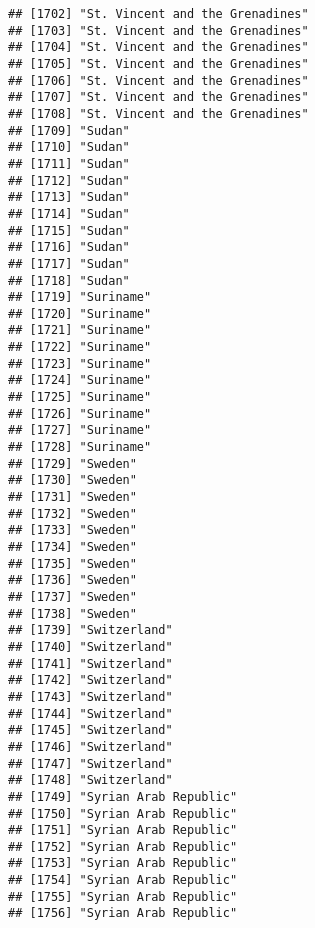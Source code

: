 \documentclass[]{article}
\begin{document}
\begin{verbatim}
## [1702] "St. Vincent and the Grenadines"     
## [1703] "St. Vincent and the Grenadines"     
## [1704] "St. Vincent and the Grenadines"     
## [1705] "St. Vincent and the Grenadines"     
## [1706] "St. Vincent and the Grenadines"     
## [1707] "St. Vincent and the Grenadines"     
## [1708] "St. Vincent and the Grenadines"     
## [1709] "Sudan"                              
## [1710] "Sudan"                              
## [1711] "Sudan"                              
## [1712] "Sudan"                              
## [1713] "Sudan"                              
## [1714] "Sudan"                              
## [1715] "Sudan"                              
## [1716] "Sudan"                              
## [1717] "Sudan"                              
## [1718] "Sudan"                              
## [1719] "Suriname"                           
## [1720] "Suriname"                           
## [1721] "Suriname"                           
## [1722] "Suriname"                           
## [1723] "Suriname"                           
## [1724] "Suriname"                           
## [1725] "Suriname"                           
## [1726] "Suriname"                           
## [1727] "Suriname"                           
## [1728] "Suriname"                           
## [1729] "Sweden"                             
## [1730] "Sweden"                             
## [1731] "Sweden"                             
## [1732] "Sweden"                             
## [1733] "Sweden"                             
## [1734] "Sweden"                             
## [1735] "Sweden"                             
## [1736] "Sweden"                             
## [1737] "Sweden"                             
## [1738] "Sweden"                             
## [1739] "Switzerland"                        
## [1740] "Switzerland"                        
## [1741] "Switzerland"                        
## [1742] "Switzerland"                        
## [1743] "Switzerland"                        
## [1744] "Switzerland"                        
## [1745] "Switzerland"                        
## [1746] "Switzerland"                        
## [1747] "Switzerland"                        
## [1748] "Switzerland"                        
## [1749] "Syrian Arab Republic"               
## [1750] "Syrian Arab Republic"               
## [1751] "Syrian Arab Republic"               
## [1752] "Syrian Arab Republic"               
## [1753] "Syrian Arab Republic"               
## [1754] "Syrian Arab Republic"               
## [1755] "Syrian Arab Republic"               
## [1756] "Syrian Arab Republic"               

\end{verbatim}
\end{document}
